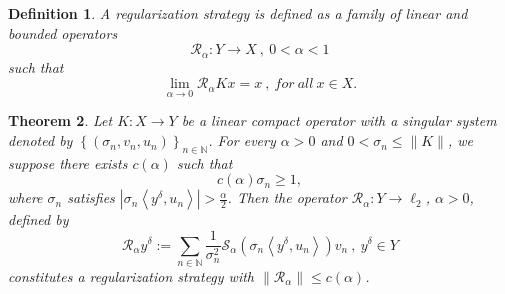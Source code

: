 \documentclass[a4paper,12pt]{article}
\newtheorem{theorem}{Theorem}[section]
\newtheorem{definition}[theorem]{Definition}
\numberwithin{equation}{section}
\begin{document}
\begin{definition}\label{def3.5}
    A regularization strategy is defined as a family of linear and bounded operators
    \begin{equation*}
        \mathcal{R}_{\alpha}:Y\rightarrow X\ ,\ 0<\alpha<1
    \end{equation*}
    such that
    \begin{equation*}
        \lim_{\alpha\rightarrow 0}\mathcal{R}_{\alpha}Kx=x\ ,\ for\ all\ x\in X.
    \end{equation*}
\end{definition}

\begin{theorem}\label{the3.6}
    Let $K: X\rightarrow Y$ be a linear compact operator with a singular system denoted by $\left\{\left(\sigma_{n},v_{n},u_{n}\right)\right\}_{n\in\mathbb{N}}$. For every $\alpha>0$ and $0<\sigma_{n}\leq\|K\|$, we suppose there exists $c(\alpha)$ such that
    \begin{equation*}
        c(\alpha)\sigma_{n}\geq 1,
    \end{equation*}
    where $\sigma_{n}$ satisfies $\left|\sigma_{n}\left<y^{\delta}, u_{n}\right>\right|>\frac{\alpha}{2}$. Then the operator $\mathcal{R}_{\alpha}:Y\rightarrow \ell_{2}$, $\alpha>0$, defined by
    \begin{equation*}
        \mathcal{R}_{\alpha}y^{\delta}:=\sum_{n\in\mathbb{N}}\frac{1}{\sigma_{n}^2}\mathcal{S}_{\alpha}(\sigma_{n}\left<y^{\delta},u_{n}\right>)v_{n}\ ,\ y^{\delta}\in Y
    \end{equation*}
    constitutes a regularization strategy with $\|\mathcal{R}_{\alpha}\|\leq c(\alpha)$.
\end{theorem}
\end{document}
